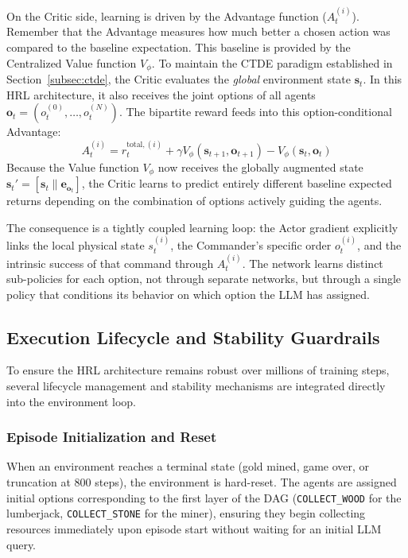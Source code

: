 On the Critic side, learning is driven by the Advantage function ($A_t^{(i)}$). Remember that the Advantage measures how much better a chosen action was compared to the baseline expectation. This baseline is provided by the Centralized Value function $V_\phi$. 
To maintain the CTDE paradigm established in Section~\ref{subsec:ctde}, the Critic evaluates the \emph{global} environment state $\mathbf{s}_t$. In this HRL architecture, it also receives the joint options of all agents $\mathbf{o}_t = (o_t^{(0)}, \dots, o_t^{(N)})$. The bipartite reward feeds into this option-conditional Advantage:
\begin{equation}
    A_t^{(i)} = r_t^{\text{total}, (i)} + \gamma V_\phi(\mathbf{s}_{t+1}, \mathbf{o}_{t+1}) - V_\phi(\mathbf{s}_t, \mathbf{o}_t)
\end{equation}
Because the Value function $V_\phi$ now receives the globally augmented state $\mathbf{s}_t' = [\mathbf{s}_t \parallel \mathbf{e}_{\mathbf{o}_t}]$, the Critic learns to predict entirely different baseline expected returns depending on the combination of options actively guiding the agents.

The consequence is a tightly coupled learning loop: the Actor gradient explicitly links the local physical state $s_t^{(i)}$, the Commander's specific order $o_t^{(i)}$, and the intrinsic success of that command through $A_t^{(i)}$. The network learns distinct sub-policies for each option, not through separate networks, but through a single policy that conditions its behavior on which option the LLM has assigned.

\subsection{Execution Lifecycle and Stability Guardrails}
\label{sec:lifecycle_guardrails}

To ensure the HRL architecture remains robust over millions of training steps, several lifecycle management and stability mechanisms are integrated directly into the environment loop.

\subsubsection{Episode Initialization and Reset}
When an environment reaches a terminal state (gold mined, game over, or truncation at 800 steps), the environment is hard-reset. The agents are assigned initial options corresponding to the first layer of the DAG (\texttt{COLLECT\_WOOD} for the lumberjack, \texttt{COLLECT\_STONE} for the miner), ensuring they begin collecting resources immediately upon episode start without waiting for an initial LLM query.


